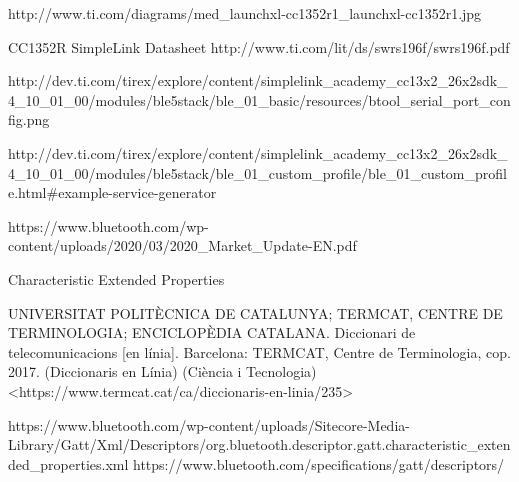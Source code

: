 \begin{thebibliography}{2}
http://www.ti.com/diagrams/med\_launchxl-cc1352r1\_launchxl-cc1352r1.jpg

CC1352R SimpleLink Datasheet
http://www.ti.com/lit/ds/swrs196f/swrs196f.pdf

http://dev.ti.com/tirex/explore/content/simplelink\_academy\_cc13x2\_26x2sdk\_4\_10\_01\_00/modules/ble5stack/ble\_01\_basic/resources/btool\_serial\_port\_config.png

http://dev.ti.com/tirex/explore/content/simplelink\_academy\_cc13x2\_26x2sdk\_4\_10\_01\_00/modules/ble5stack/ble\_01\_custom\_profile/ble\_01\_custom\_profile.html\#example-service-generator

https://www.bluetooth.com/wp-content/uploads/2020/03/2020\_Market\_Update-EN.pdf

Characteristic Extended Properties

UNIVERSITAT POLITÈCNICA DE CATALUNYA; TERMCAT, CENTRE DE TERMINOLOGIA; ENCICLOPÈDIA CATALANA. Diccionari de telecomunicacions [en línia]. Barcelona: TERMCAT, Centre de Terminologia, cop. 2017. (Diccionaris en Línia) (Ciència i Tecnologia)
<https://www.termcat.cat/ca/diccionaris-en-linia/235>

https://www.bluetooth.com/wp-content/uploads/Sitecore-Media-Library/Gatt/Xml/Descriptors/org.bluetooth.descriptor.gatt.characteristic\_extended\_properties.xml
https://www.bluetooth.com/specifications/gatt/descriptors/

\end{thebibliography}